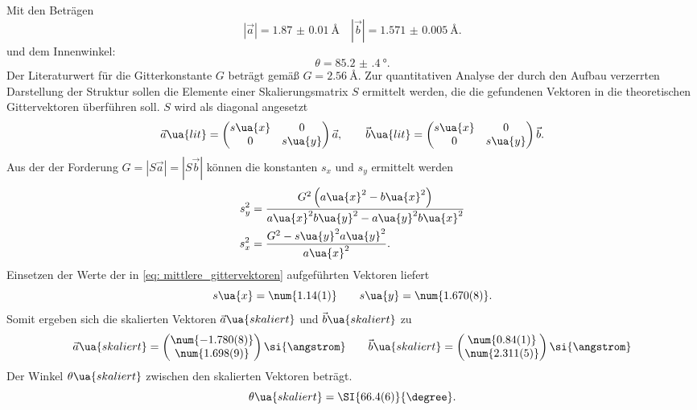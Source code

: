 Mit den Beträgen
\begin{equation}
  \left|\vec{a}\right| = \SI{1.87(1)}{\angstrom} \quad \left|\vec{b}\right| = \SI{1.571(5)}{\angstrom}.
  \label{eq: mittlere_gittervektoren}
\end{equation}
und dem Innenwinkel:
\begin{equation}
  \theta = \SI{85.2(4)}{\degree}.
\end{equation}
Der Literaturwert für die Gitterkonstante $G$ beträgt gemäß \cite{} $G = \SI{2.56}{\angstrom}$. Zur quantitativen Analyse
der durch den Aufbau verzerrten Darstellung der Struktur sollen die Elemente einer Skalierungsmatrix $S$ ermittelt werden, die
die gefundenen Vektoren in die theoretischen Gittervektoren überführen soll. $S$ wird als diagonal angesetzt
\begin{equation}
  \vec{a}\ua{lit} = \begin{pmatrix} s\ua{x} & 0 \\  0  &   s\ua{y} \end{pmatrix} \vec{a},
  \qquad \vec{b}\ua{lit} = \begin{pmatrix} s\ua{x} & 0 \\  0  &   s\ua{y} \end{pmatrix} \vec{b}.
\end{equation}
Aus der der Forderung $G = \left|S \vec{a}\right| = \left|S \vec{b}\right|$ können die konstanten $s_x$ und $s_y$ ermittelt werden
\begin{align}
  s_y^2 &= \frac{G^2\left( a\ua{x}^2 - b\ua{x}^2\right)}{a\ua{x}^2 b\ua{y}^2 - a\ua{y}^2 b\ua{x}^2} \\
  s_x^2 &= \frac{G^2 - s\ua{y}^2 a\ua{y}^2}{a\ua{x}^2}.
\end{align}
Einsetzen der Werte der in \eqref{eq: mittlere_gittervektoren} aufgeführten Vektoren liefert
\begin{equation}
  s\ua{x} = \num{1.14(1)}  \qquad s\ua{y} = \num{1.670(8)}.
\end{equation}
Somit ergeben sich die skalierten Vektoren $\vec{a}\ua{skaliert}$ und $\vec{b}\ua{skaliert}$ zu
\begin{equation}
  \vec{a}\ua{skaliert} = \begin{pmatrix} \num{-1.780(8)} \\  \num{1.698(9)} \end{pmatrix}\si{\angstrom} \qquad
  \vec{b}\ua{skaliert} = \begin{pmatrix} \num{0.84(1)} \\  \num{2.311(5)} \end{pmatrix}\si{\angstrom}
\end{equation}
Der Winkel $\theta\ua{skaliert}$ zwischen den skalierten Vektoren beträgt.
\begin{equation}
  \theta\ua{skaliert} = \SI{66.4(6)}{\degree}.
\end{equation}


